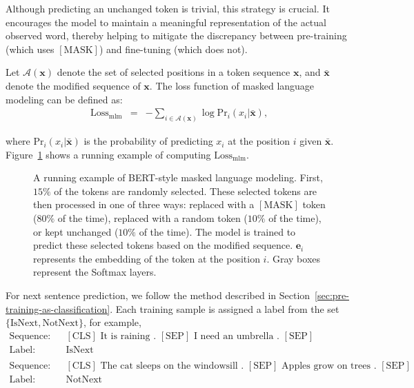 \begin{itemize}
Although predicting an unchanged token is trivial, this strategy is crucial. It encourages the model to maintain a meaningful representation of the actual observed word, thereby helping to mitigate the discrepancy between pre-training (which uses $\mathrm{[MASK]}$) and fine-tuning (which does not).

\end{itemize}
\vspace{0.3em}

Let $\mathcal{A}(\mathbf{x})$ denote the set of selected positions in a token sequence $\mathbf{x}$, and $\bar{\mathbf{x}}$ denote the modified sequence of $\mathbf{x}$. The loss function of masked language modeling can be defined as:
\begin{eqnarray}
\mathrm{Loss}_{\mathrm{mlm}} & = & - \sum_{i \in \mathcal{A}(\mathbf{x})} \log \mathrm{Pr}_i(x_i|\bar{\mathbf{x}}),
\end{eqnarray}

\noindent where $\mathrm{Pr}_i(x_i|\bar{\mathbf{x}})$ is the probability of predicting $x_i$ at the position $i$ given $\bar{\mathbf{x}}$. Figure~\ref{fig:example-bert-mlm-loss} shows a running example of computing $\mathrm{Loss}_{\mathrm{mlm}}$.

\begin{figure}[!t]
\centering

\caption{A running example of BERT-style masked language modeling. First, $15\%$ of the tokens are randomly selected. These selected tokens are then processed in one of three ways: replaced with a $\mathrm{[MASK]}$ token ($80\%$ of the time), replaced with a random token ($10\%$ of the time), or kept unchanged ($10\%$ of the time). The model is trained to predict these selected tokens based on the modified sequence. $\mathbf{e}_i$ represents the embedding of the token at the position $i$. Gray boxes represent the Softmax layers.}
\label{fig:example-bert-mlm-loss}
\end{figure}

For next sentence prediction, we follow the method described in Section~\ref{sec:pre-training-as-classification}. Each training sample is assigned a label from the set $\{\mathrm{IsNext}, \mathrm{NotNext}\}$, for example,
\begin{eqnarray}
\textrm{Sequence:} & & \textrm{$[\mathrm{CLS}]$ It is raining . $[\mathrm{SEP}]$ I need an umbrella . $[\mathrm{SEP}]$} \nonumber \\
\textrm{Label:} & & \textrm{$\mathrm{IsNext}$} \nonumber \\
& & \nonumber \\
\textrm{Sequence:} & & \textrm{$[\mathrm{CLS}]$ The cat sleeps on the windowsill . $[\mathrm{SEP}]$ Apples grow on trees . $[\mathrm{SEP}]$} \nonumber \\
\textrm{Label:} & & \textrm{$\mathrm{NotNext}$} \nonumber
\end{eqnarray}

